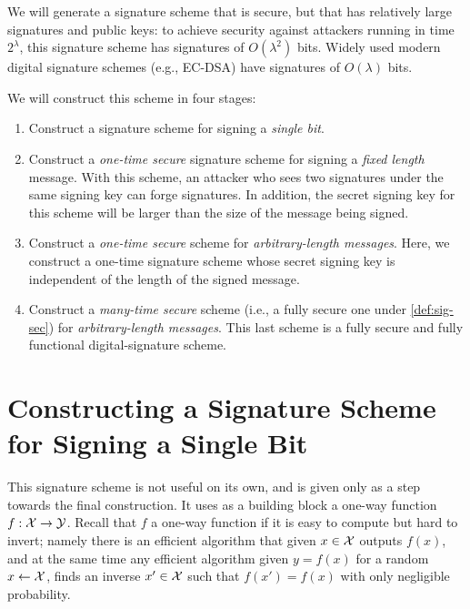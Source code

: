 We will generate a signature scheme that is secure, but that has relatively large
signatures and public keys: to achieve security against attackers running
in time $2^\lambda$, this signature scheme has signatures of $O(\lambda^2)$ bits.
Widely used modern digital signature schemes (e.g., EC-DSA) have signatures
of $O(\lambda)$ bits.

We will construct this scheme in four stages:

\begin{enumerate}
	\item Construct a signature scheme for signing a \emph{single bit}.  

        \item Construct a \emph{one-time secure} signature scheme for signing a \emph{fixed length} message.
        With this scheme, an attacker who sees two signatures under the same signing key can forge signatures.
        In addition, the secret signing key for this scheme will be larger than the size of the message 
        being signed.
      \item Construct a \emph{one-time secure} scheme for \emph{arbitrary-length messages}.
        Here, we construct a one-time signature scheme whose secret signing key is independent of 
        the length of the signed message.

      \item Construct a \emph{many-time secure} scheme (i.e., a fully secure one under 
        \cref{def:sig-sec}) for \emph{arbitrary-length messages}.
        This last scheme is a fully secure and fully functional digital-signature scheme.
\end{enumerate}

\section{Constructing a Signature Scheme for Signing a Single Bit}

This signature scheme is not useful on its own, and is given only as a step towards the final construction.  It uses as a building block a one-way function $f:\mathcal{X}\rightarrow\mathcal{Y}$.  Recall that $f$ a one-way function if it is easy to compute but hard to invert; namely there is an efficient algorithm that given $x\in\mathcal{X}$ outputs $f(x)$, and at the same time any efficient algorithm given $y=f(x)$ for a random $x\leftarrow \cal X$, finds an inverse $x'\in\mathcal{X}$ such that $f(x')=f(x)$ with only negligible probability.  

